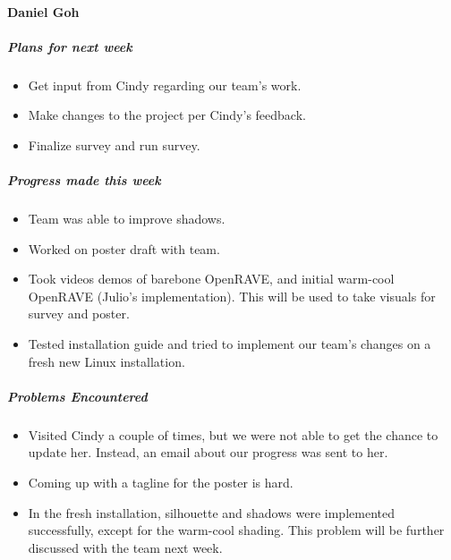 {\vspace{3mm}
\paragraph{Daniel Goh}
\subparagraph{Plans for next week}
\begin{itemize}
  \item Get input from Cindy regarding our team's work.
  \item Make changes to the project per Cindy's feedback.
  \item Finalize survey and run survey.
\end{itemize}

\subparagraph{Progress made this week}
\begin{itemize}
  \item Team was able to improve shadows.
  \item Worked on poster draft with team.
  \item Took videos demos of barebone OpenRAVE, and initial warm-cool OpenRAVE (Julio's implementation). This will be used to take visuals for survey and poster.
  \item Tested installation guide and tried to implement our team's changes on a fresh new Linux installation.
\end{itemize}

\subparagraph{Problems Encountered}
\begin{itemize}
  \item Visited Cindy a couple of times, but we were not able to get the chance to update her. Instead, an email about our progress was sent to her.
  \item Coming up with a tagline for the poster is hard.
  \item In the fresh installation, silhouette and shadows were implemented successfully, except for the warm-cool shading. This problem will be further discussed with the team next week.
\end{itemize}

}

\newpage

